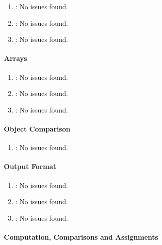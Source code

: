 \begin{enumerate} [resume]
	\item \emph{\checkAH}: No issues found.
	\item \emph{\checkAI}: No issues found.
	\item \emph{\checkAJ}: No issues found.
\end{enumerate} 

\paragraph{Arrays} %
\label{par:arrays}

\begin{enumerate} [resume]
	\item \emph{\checkAK}: No issues found.
	\item \emph{\checkAL}: No issues found.
	\item \emph{\checkAM}: No issues found.
\end{enumerate}

\paragraph{Object Comparison} %
\label{par:object_comparison}

\begin{enumerate} [resume]
	\item \emph{\checkAN}: No issues found.
\end{enumerate}

\paragraph{Output Format} %
\label{par:output_format}

\begin{enumerate} [resume]
	\item \emph{\checkAO}: No issues found.
	\item \emph{\checkAP}: No issues found.
	\item \emph{\checkAQ}: No issues found.
\end{enumerate}

\paragraph{Computation, Comparisons and Assignments} %
\label{par:computation_comparisons_and_assignments}

